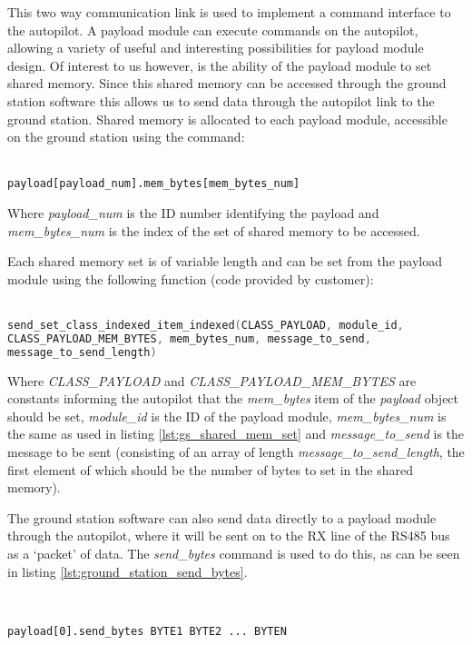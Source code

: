 This two way communication link is used to implement a command interface to 
the autopilot. A payload module can execute commands on the autopilot, 
allowing a variety of useful and interesting possibilities for payload
module design. Of interest to us however, is the ability of the payload
module to set shared memory. Since this shared memory can be accessed 
through the ground station software this allows us to send data through the
autopilot link to the ground station. Shared memory is allocated to 
each payload module, accessible on the ground station using the command:
~\\
~\\
\begin{lstlisting}[caption={Accessing shared memory from ground station, typed directly into the software.}, label=lst:gs_shared_mem_set]
payload[payload_num].mem_bytes[mem_bytes_num]
\end{lstlisting}

Where \emph{payload\_num} is the ID number identifying the payload and 
\emph{mem\_bytes\_num} is the index of the set of shared memory to be accessed.

Each shared memory set is of variable length and can be set from the payload 
module using the following function (code provided by customer):
~\\
~\\
\begin{lstlisting}[language=C, caption={Setting shared memory from payload module, typed directly into the software.}, label=lst:payload_shared_mem_set]
send_set_class_indexed_item_indexed(CLASS_PAYLOAD, module_id, 
CLASS_PAYLOAD_MEM_BYTES, mem_bytes_num, message_to_send,
message_to_send_length)
\end{lstlisting}

Where \emph{CLASS\_PAYLOAD} and \emph{CLASS\_PAYLOAD\_MEM\_BYTES} are constants 
informing the autopilot that the \emph{mem\_bytes} item of the \emph{payload} 
object should be set, \emph{module\_id} is the ID of the payload module,
\emph{mem\_bytes\_num} is the same as used in listing
\ref{lst:gs_shared_mem_set} and \emph{message\_to\_send} is the message to be 
sent (consisting of an array of length \emph{message\_to\_send\_length}, the 
first element of which should be the number of bytes to set in the shared 
memory).

The ground station software can also send data directly to a payload module 
through the autopilot, where it will be sent on to the RX line of the RS485
bus as a `packet' of data. The \emph{send\_bytes} command is used to do this, as can be seen in 
listing \ref{lst:ground_station_send_bytes}. 

~\\
\begin{lstlisting}[caption={Sending bytes 1 to N from ground station to payload module, typed directly into the software. BYTE1...N can be in decimal (e.g. 5) or hexidecimal format (e.g. 0x5).}, label=lst:ground_station_send_bytes]
payload[0].send_bytes BYTE1 BYTE2 ... BYTEN 
\end{lstlisting} 
